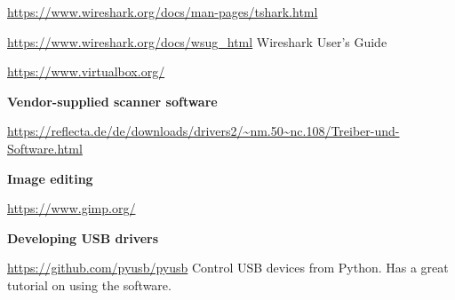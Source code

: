\documentclass{article}
\begin{document}
\begin{thebibliography}{}
  \url{https://www.wireshark.org/docs/man-pages/tshark.html}
  
  \url{https://www.wireshark.org/docs/wsug_html}
  Wireshark User's Guide

  \url{https://www.virtualbox.org/}

  \item[]\hspace{-\labelwidth}\hspace{-\labelsep}\textbf{Vendor-supplied scanner software}

  \url{https://reflecta.de/de/downloads/drivers2/~nm.50~nc.108/Treiber-und-Software.html}

  \item[]\hspace{-\labelwidth}\hspace{-\labelsep}\textbf{Image editing}

  \url{https://www.gimp.org/}

  \item[]\hspace{-\labelwidth}\hspace{-\labelsep}\textbf{Developing USB drivers}

  \url{https://github.com/pyusb/pyusb} Control USB devices from Python.
  Has a great tutorial on using the software.
\end{thebibliography}
\end{document}
